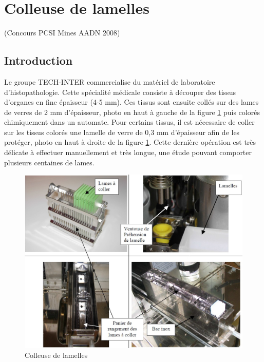 \newpage

\section{Colleuse de lamelles}

(Concours PCSI Mines AADN 2008)

\subsection{Introduction}

Le groupe TECH-INTER commercialise du matériel de laboratoire d'histopathologie. Cette spécialité médicale consiste à découper des tissus d'organes en fine épaisseur (4-5 mm). Ces tissus sont ensuite collés sur des lames de verres de 2 mm d'épaisseur, photo en haut à gauche de la figure \ref{fig:image101} puis colorés chimiquement dans un automate. Pour certains tissus, il est nécessaire de coller sur les tissus colorés une lamelle de verre de 0,3 mm d'épaisseur afin de les protéger, photo en haut à droite de la figure \ref{fig:image101}. Cette dernière opération est très délicate à effectuer manuellement et très longue, une étude pouvant comporter plusieurs centaines de lames.

\begin{figure}[htbp]
\begin{center}
\includegraphics[width=0.95\linewidth]{img/Image1.jpg}
\caption{Colleuse de lamelles}
\label{fig:image101}
\end{center}
\end{figure}

